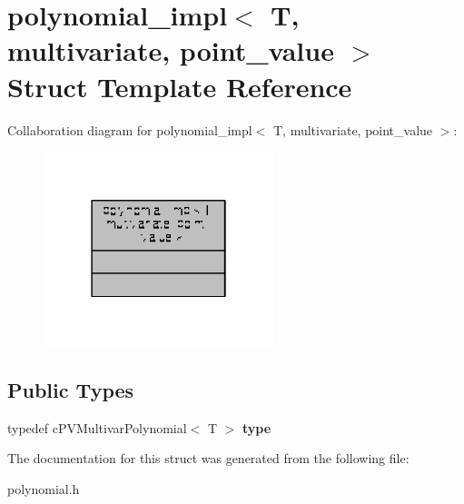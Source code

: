\hypertarget{structpolynomial__impl_3_01T_00_01multivariate_00_01point__value_01_4}{\section{polynomial\-\_\-impl$<$ T, multivariate, point\-\_\-value $>$ Struct Template Reference}
\label{structpolynomial__impl_3_01T_00_01multivariate_00_01point__value_01_4}
}


Collaboration diagram for polynomial\-\_\-impl$<$ T, multivariate, point\-\_\-value $>$\-:
\nopagebreak
\begin{figure}[H]
\begin{center}
\leavevmode
\includegraphics[width=190pt]{structpolynomial__impl_3_01T_00_01multivariate_00_01point__value_01_4__coll__graph}
\end{center}
\end{figure}
\subsection*{Public Types}
\begin{DoxyCompactItemize}
\item 
\hypertarget{structpolynomial__impl_3_01T_00_01multivariate_00_01point__value_01_4_a2d3c3fac2ae46c37c81d79810da98c36}{typedef c\-P\-V\-Multivar\-Polynomial$<$ T $>$ {\bfseries type}}\label{structpolynomial__impl_3_01T_00_01multivariate_00_01point__value_01_4_a2d3c3fac2ae46c37c81d79810da98c36}

\end{DoxyCompactItemize}


The documentation for this struct was generated from the following file\-:\begin{DoxyCompactItemize}
\item 
polynomial.\-h\end{DoxyCompactItemize}
